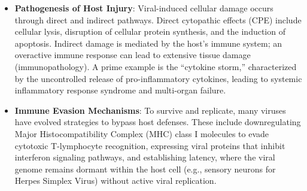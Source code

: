 \begin{itemize}
    \item \textbf{Pathogenesis of Host Injury}: Viral-induced cellular damage occurs through direct and indirect pathways. Direct cytopathic effects (CPE) include cellular lysis, disruption of cellular protein synthesis, and the induction of apoptosis. Indirect damage is mediated by the host's immune system; an overactive immune response can lead to extensive tissue damage (immunopathology). A prime example is the ``cytokine storm,'' characterized by the uncontrolled release of pro-inflammatory cytokines, leading to systemic inflammatory response syndrome and multi-organ failure.
    \item \textbf{Immune Evasion Mechanisms}: To survive and replicate, many viruses have evolved strategies to bypass host defenses. These include downregulating Major Histocompatibility Complex (MHC) class I molecules to evade cytotoxic T-lymphocyte recognition, expressing viral proteins that inhibit interferon signaling pathways, and establishing latency, where the viral genome remains dormant within the host cell (e.g., sensory neurons for Herpes Simplex Virus) without active viral replication.
\end{itemize}

